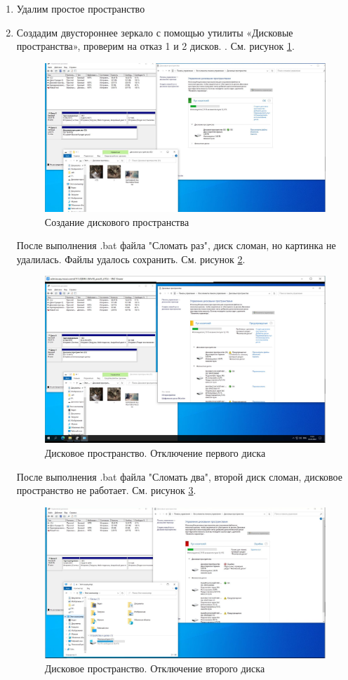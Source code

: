 \documentclass[a4paper,14pt]{extarticle}
\begin{document}
\begin{enumerate}
		
		\item Удалим простое пространство
		\item Создадим двустороннее зеркало с помощью утилиты «Дисковые пространства»,
проверим на отказ 1 и 2 дисков. . См. рисунок \ref{fig:12}.
	

		\begin{figure}[h!]
			\centering
			\includegraphics[width=0.7\linewidth]{12}
			\caption{Создание дискового пространства}
			\label{fig:12}
		\end{figure}
	
		
		\newpage
			После выполнения .bat файла "Сломать раз", диск сломан, но картинка не удалилась. Файлы удалось сохранить. См. рисунок \ref{fig:13}.

		
		\begin{figure}[h!]
			\centering
			\includegraphics[width=0.7\linewidth]{13}
			\caption{Дисковое пространство. Отключение первого диска}
			\label{fig:13}
		\end{figure}
	
		
			После выполнения .bat файла "Сломать два", второй диск сломан, дисковое пространство не работает. См. рисунок \ref{fig:14}.
		\begin{figure}[h!]
			\centering
			\includegraphics[width=0.7\linewidth]{14}
			\caption{Дисковое пространство. Отключение второго диска}
			\label{fig:14}
		\end{figure}
		

\end{enumerate}
\end{document}
